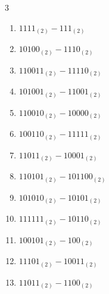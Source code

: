 \begin{multicols}{3}
\begin{enumerate}

  \item $1111_{(2)} - 111_{(2)}$


  \item $10100_{(2)} - 1110_{(2)}$


  \item $110011_{(2)} - 11110_{(2)}$


\columnbreak %

  \item $101001_{(2)} - 11001_{(2)}$


  \item $110010_{(2)} - 10000_{(2)}$


  \item $100110_{(2)} - 11111_{(2)}$


  \item $11011_{(2)} - 10001_{(2)}$


  \item $110101_{(2)} - 101100_{(2)}$


  \item $101010_{(2)} - 10101_{(2)}$


  \item $111111_{(2)} - 10110_{(2)}$


  \item $100101_{(2)} - 100_{(2)}$


  \item $11101_{(2)} - 10011_{(2)}$


  \item $11011_{(2)} - 1100_{(2)}$



\end{enumerate}
\end{multicols}
